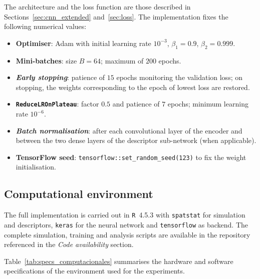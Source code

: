 \documentclass[a4paper,fleqn]{cas-sc}
\numberwithin{equation}{section}
\begin{document}
The architecture and the loss function are those described in
Sections~\ref{sec:cnn_extended} and~\ref{sec:loss}. The
implementation fixes the following numerical values:
\begin{itemize}
    \item \textbf{Optimiser}: Adam with initial learning rate
    $10^{-3}$, $\beta_1=0.9$, $\beta_2=0.999$.
    \item \textbf{Mini-batches}: size $B=64$; maximum of $200$
    epochs.
    \item \textbf{\textit{Early stopping}}: patience of $15$ epochs
    monitoring the validation loss; on stopping, the weights
    corresponding to the epoch of lowest loss are restored.
    \item \textbf{\texttt{ReduceLROnPlateau}}: factor $0.5$ and
    patience of $7$ epochs; minimum learning rate $10^{-6}$.
    \item \textbf{\textit{Batch normalisation}}: after each
    convolutional layer of the encoder and between the two dense
    layers of the descriptor sub-network (when applicable).
    \item \textbf{TensorFlow seed}:
    \texttt{tensorflow::set\_random\_seed(123)} to fix the weight
    initialisation.
\end{itemize}

\subsection{Computational environment}
\label{app:env}

The full implementation is carried out in \texttt{R}~4.5.3
\citep{R} with \texttt{spatstat} \citep{spatstat} for simulation and
descriptors, \texttt{keras} \citep{keras, keras_book} for the neural
network and \texttt{tensorflow} as backend. The complete
simulation, training and analysis scripts are available in the
repository referenced in the \emph{Code availability} section.

Table~\ref{tab:specs_computacionales} summarises the hardware and
software specifications of the environment used for the experiments.
\end{document}
